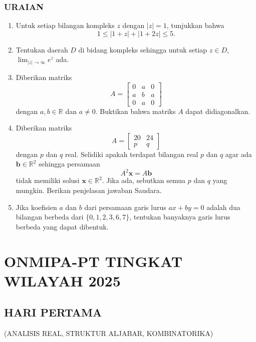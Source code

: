 \documentclass[12pt,twoside]{article}
\begin{document}
\subsubsection*{URAIAN}
\begin{enumerate}
	\item Untuk setiap bilangan kompleks \( z \) dengan \( |z| = 1 \), tunjukkan bahwa
	      \[
		      1 \leq |1+z| + |1+2z| \leq 5.
	      \]

	\item Tentukan daerah \( D \) di bidang kompleks sehingga untuk setiap \( z \in D \), \(\displaystyle\lim_{|z|\to\infty} e^z\) ada.

	\item Diberikan matriks
	      \[
		      A = \begin{bmatrix}
			      0 & a & 0 \\
			      a & b & a \\
			      0 & a & 0
		      \end{bmatrix}
	      \]
	      dengan \( a, b \in \mathbb{R} \) dan \( a \neq 0 \). Buktikan bahwa matriks \( A \) dapat didiagonalkan.

	\item Diberikan matriks
	      \[
		      A = \begin{bmatrix}
			      20 & 24 \\
			      p  & q
		      \end{bmatrix}
	      \]
	      dengan \( p \) dan \( q \) real. Selidiki apakah terdapat bilangan real \( p \) dan \( q \) agar ada \( \mathbf{b} \in \mathbb{R}^2 \) sehingga persamaan
	      \[
		      A^2 \mathbf{x} = A \mathbf{b}
	      \]
	      tidak memiliki solusi \( \mathbf{x} \in \mathbb{R}^2 \). Jika ada, sebutkan semua \( p \) dan \( q \) yang mungkin. Berikan penjelasan jawaban Saudara.

	\item Jika koefisien \( a \) dan \( b \) dari persamaan garis lurus \( ax + by = 0 \) adalah dua bilangan berbeda dari \( \{0,1,2,3,6,7\} \), tentukan banyaknya garis lurus berbeda yang dapat dibentuk.

\end{enumerate}

\newpage
{}
\section{ONMIPA-PT TINGKAT WILAYAH 2025}
\subsection{HARI PERTAMA}
\begin{center}
	(ANALISIS REAL, STRUKTUR ALJABAR, KOMBINATORIKA)
\end{center}
\end{document}
